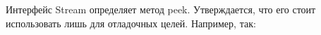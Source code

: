 \begin{frame}
\frametitle{\insertsection} 
\framesubtitle{\insertsubsection}
Интерфейс Stream определяет метод peek. Утверждается, что его стоит использовать лишь для отладочных целей. Например, так:
\inputminted{java}{code/StreamWithPeeks.java}
\end{frame}
